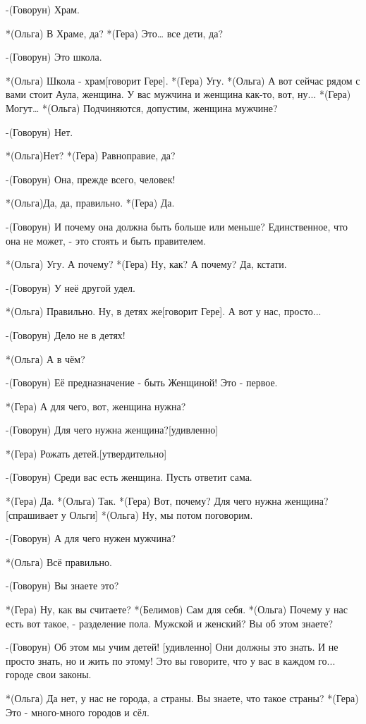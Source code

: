 -(Говорун) Храм.

*(Ольга) В Храме, да?
*(Гера) Это… все дети, да?

-(Говорун) Это школа.

*(Ольга) Школа - храм[говорит Гере].
*(Гера) Угу.
*(Ольга) А вот сейчас рядом с вами стоит Аула, женщина. У вас мужчина и женщина как-то, вот, ну...
*(Гера) Могут…
*(Ольга) Подчиняются, допустим, женщина мужчине?

-(Говорун) Нет.

*(Ольга)Нет?
*(Гера) Равноправие, да?

-(Говорун) Она, прежде всего, человек!

*(Ольга)Да, да, правильно.
*(Гера) Да.

-(Говорун) И почему она должна быть больше или меньше? Единственное, что она не может, - это стоять и быть правителем.

*(Ольга) Угу. А почему?
*(Гера) Ну, как? А почему? Да, кстати.

-(Говорун) У неё другой удел.

*(Ольга) Правильно. Ну, в детях же[говорит Гере]. А вот у нас, просто...

-(Говорун) Дело не в детях!

*(Ольга) А в чём?

-(Говорун) Её предназначение - быть Женщиной! Это - первое.

*(Гера) А для чего, вот, женщина нужна?

-(Говорун) Для чего нужна женщина?[удивленно]

*(Гера) Рожать детей.[утвердительно]

-(Говорун) Среди вас есть женщина. Пусть ответит сама.

*(Гера) Да.
*(Ольга) Так.
*(Гера) Вот, почему? Для чего нужна женщина? [спрашивает у Ольги]
*(Ольга) Ну, мы потом поговорим.

-(Говорун) А для чего нужен мужчина?

*(Ольга) Всё правильно.

-(Говорун) Вы знаете это?

*(Гера) Ну, как вы считаете?
*(Белимов) Сам для себя.
*(Ольга) Почему у нас есть вот такое, - разделение пола. Мужской и женский? Вы об этом знаете?

-(Говорун) Об этом мы учим детей! [удивленно] Они должны это знать. И не просто знать, но и жить по этому! Это вы говорите, что у вас в каждом го... городе свои законы.

*(Ольга) Да нет, у нас не города, а страны. Вы знаете, что такое страны?
*(Гера) Это - много-много городов и сёл.

